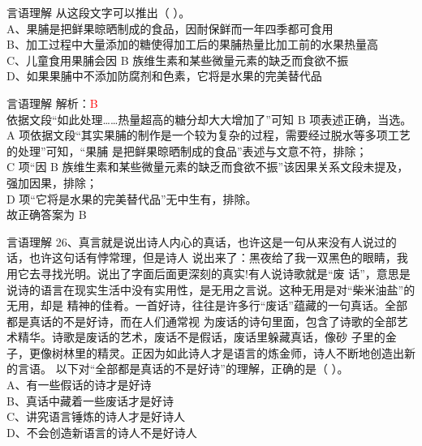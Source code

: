 \documentclass[aspectratio=169]{beamer}
\begin{document}
\begin{frame}[t]{言语理解}
    从这段文字可以推出（ ）。\\
    A、果脯是把鲜果晾晒制成的食品，因耐保鲜而一年四季都可食用\\
    B、加工过程中大量添加的糖使得加工后的果脯热量比加工前的水果热量高\\
    C、儿童食用果脯会因 B 族维生素和某些微量元素的缺乏而食欲不振\\
    D、如果果脯中不添加防腐剂和色素，它将是水果的完美替代品\\

\end{frame}



\begin{frame}[t]{言语理解}
    解析：\textcolor{red}{B}\\
    依据文段“如此处理……热量超高的糖分却大大增加了”可知 B 项表述正确，当选。\\
    A 项依据文段“其实果脯的制作是一个较为复杂的过程，需要经过脱水等多项工艺的处理”可知，“果脯
    是把鲜果晾晒制成的食品”表述与文意不符，排除；\\
    C 项“因 B 族维生素和某些微量元素的缺乏而食欲不振”该因果关系文段未提及，强加因果，排除；\\
    D 项“它将是水果的完美替代品”无中生有，排除。\\
    故正确答案为 B
\end{frame}



\begin{frame}[t]{言语理解}
    26、真言就是说出诗人内心的真话，也许这是一句从来没有人说过的话，也许这句话有悖常理，但是诗人
    说出来了：黑夜给了我一双黑色的眼睛，我用它去寻找光明。说出了字面后面更深刻的真实!有人说诗歌就是“废
    话”，意思是说诗的语言在现实生活中没有实用性，是无用之言说。这种无用是对“柴米油盐”的无用，却是
    精神的佳肴。一首好诗，往往是许多行“废话”蕴藏的一句真话。全部都是真话的不是好诗，而在人们通常视
    为废话的诗句里面，包含了诗歌的全部艺术精华。诗歌是废话的艺术，废话不是假话，废话里躲藏真话，像砂
    子里的金子，更像树林里的精灵。正因为如此诗人才是语言的炼金师，诗人不断地创造出新的言语。
    以下对“全部都是真话的不是好诗”的理解，正确的是（ ）。\\
    A、有一些假话的诗才是好诗\\
    B、真话中藏着一些废话才是好诗\\
    C、讲究语言锤炼的诗人才是好诗人\\
    D、不会创造新语言的诗人不是好诗人\\
\end{frame}
\end{document}
